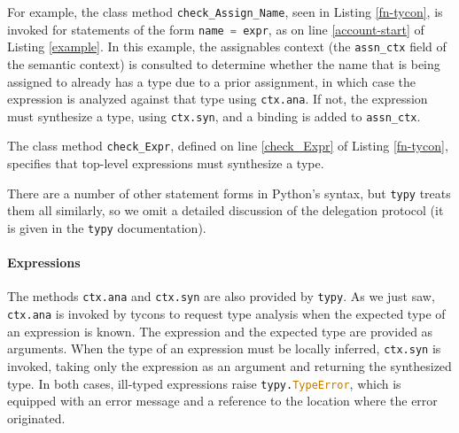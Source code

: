 \documentclass[preprint,10pt]{sigplanconf}
\newcommand{\lip}[1]{\lstinline[language=Python,basicstyle=\ttfamily\small,deletendkeywords={tuple,buffer,map}]{#1}}
\begin{document}
For example, the class method \lip{check_Assign_Name}, seen in Listing \ref{fn-tycon}, is invoked for statements of the form \lip{name = expr}, as on line \ref{account-start} of Listing \ref{example}. In this example, the assignables context (the \lip{assn_ctx} field of the semantic context) is consulted to determine whether the name that is being assigned to already has a type due to a prior assignment, in which case the expression is analyzed against that type using \lip{ctx.ana}. If not, the expression must synthesize a type, using \lip{ctx.syn}, and a binding is added to \lip{assn_ctx}. %

The class method \lip{check_Expr}, defined on line \ref{check_Expr} of Listing \ref{fn-tycon}, specifies that top-level expressions must synthesize a type.

There are a number of other statement forms in Python's syntax, but \lip{typy} treats them all similarly, so we omit a detailed discussion of the delegation protocol (it is given in the \lip{typy} documentation).



\paragraph{Expressions} The methods \lip{ctx.ana} and \lip{ctx.syn} are also provided by \verb|typy|. As we just saw, \lip{ctx.ana} is invoked by tycons to request type analysis when the expected type of an expression is known. The expression and the expected type are provided as arguments. When the type of an expression must be locally inferred, \lip{ctx.syn} is invoked, taking only the expression as an argument and returning the synthesized type. In both cases, ill-typed expressions raise \lip{typy.TypeError}, which is equipped with an error message and a reference to the location where the error originated.  
\end{document}
